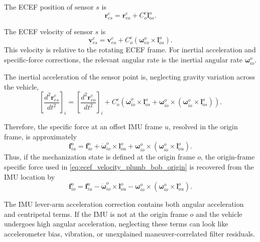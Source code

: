 \documentclass[11pt,oneside]{book}
\begin{document}
The ECEF position of sensor $s$ is
\begin{equation}
\boxed{
\mathbf{r}_{es}^{e}
=
\mathbf{r}_{eo}^{e}
+
C_o^e\mathbf{l}_{os}^{o}.
}
\label{eq:sensor_position_lever_arm_origin}
\end{equation}

The ECEF velocity of sensor $s$ is
\begin{equation}
\boxed{
\mathbf{v}_{es}^{e}
=
\mathbf{v}_{eo}^{e}
+
C_o^e
\left(
\boldsymbol{\omega}_{eo}^{o}
\times
\mathbf{l}_{os}^{o}
\right).
}
\label{eq:sensor_velocity_lever_arm_origin}
\end{equation}
This velocity is relative to the rotating ECEF frame. For inertial acceleration and specific-force corrections, the relevant angular rate is the inertial angular rate $\boldsymbol{\omega}_{io}^{o}$.

The inertial acceleration of the sensor point is, neglecting gravity variation across the vehicle,
\begin{equation}
\boxed{
\left[
\frac{d^2\mathbf{r}_{es}^{e}}{dt^2}
\right]_i
=
\left[
\frac{d^2\mathbf{r}_{eo}^{e}}{dt^2}
\right]_i
+
C_o^e
\left(
\dot{\boldsymbol{\omega}}_{io}^{o}
\times
\mathbf{l}_{os}^{o}
+
\boldsymbol{\omega}_{io}^{o}
\times
\left(
\boldsymbol{\omega}_{io}^{o}
\times
\mathbf{l}_{os}^{o}
\right)
\right).
}
\label{eq:sensor_acceleration_lever_arm_origin}
\end{equation}

Therefore, the specific force at an offset IMU frame $u$, resolved in the origin frame, is approximately
\begin{equation}
\boxed{
\mathbf{f}_{iu}^{o}
=
\mathbf{f}_{io}^{o}
+
\dot{\boldsymbol{\omega}}_{io}^{o}
\times
\mathbf{l}_{ou}^{o}
+
\boldsymbol{\omega}_{io}^{o}
\times
\left(
\boldsymbol{\omega}_{io}^{o}
\times
\mathbf{l}_{ou}^{o}
\right).
}
\label{eq:imu_specific_force_offset_origin}
\end{equation}
Thus, if the mechanization state is defined at the origin frame $o$, the origin-frame specific force used in \cref{eq:ecef_velocity_plumb_bob_origin} is recovered from the IMU location by
\begin{equation}
\boxed{
\mathbf{f}_{io}^{o}
=
\mathbf{f}_{iu}^{o}
-
\dot{\boldsymbol{\omega}}_{io}^{o}
\times
\mathbf{l}_{ou}^{o}
-
\boldsymbol{\omega}_{io}^{o}
\times
\left(
\boldsymbol{\omega}_{io}^{o}
\times
\mathbf{l}_{ou}^{o}
\right).
}
\label{eq:imu_specific_force_to_origin}
\end{equation}

\begin{warningbox}
The IMU lever-arm acceleration correction contains both angular acceleration and centripetal terms. If the IMU is not at the origin frame $o$ and the vehicle undergoes high angular acceleration, neglecting these terms can look like accelerometer bias, vibration, or unexplained maneuver-correlated filter residuals.
\end{warningbox}
\end{document}
